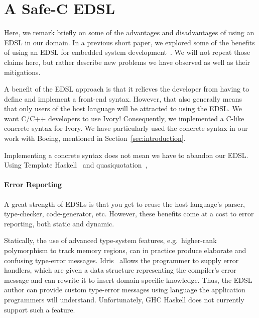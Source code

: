 \section{A Safe-C EDSL}
\label{sec:edsl}

Here, we remark briefly on some of the advantages and disadvantages of using an
EDSL in our domain. In a previous short paper, we explored some of the benefits
of using an EDSL for embedded system development~\cite{smaccm}. We will not
repeat those claims here, but rather describe new problems we have observed as
well as their mitigations.

A benefit of the EDSL approach is that it relieves the developer from having to
define and implement a front-end syntax. However, that also generally means that
only users of the host language will be attracted to using the
EDSL. We want C/C++ developers to use Ivory! Consequently, we implemented a
C-like concrete syntax for Ivory. We have particularly used the concrete syntax
in our work with Boeing, mentioned in Section~\ref{sec:introduction}.

Implementing a concrete syntax does not mean we have to abandon our EDSL. Using
Template Haskell~\cite{} and quasiquotation~\cite{}, 




\paragraph{Error Reporting}
A great strength of EDSLs is that you get to reuse the host language's parser,
type-checker, code-generator, etc. However, these benefits come at a cost to
error reporting, both static and dynamic. 

Statically, the use of advanced type-system features, e.g.\ higher-rank
polymorphism to track memory regions, can in practice produce elaborate and
confusing type-error messages.
Idris~\cite{christiansen2014reflect} allows the
programmer to supply error handlers, which are given a data structure
representing the compiler's error message and can rewrite it to insert
domain-specific knowledge. Thus, the EDSL author can provide custom type-error
messages using language the application programmers will understand.
Unfortunately, GHC Haskell does not currently support such a feature.

